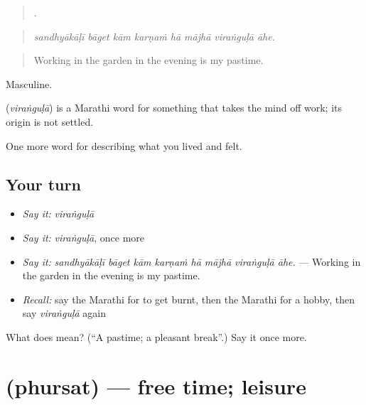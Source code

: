 \begin{quote}
       .
\end{quote}

\begin{quote}
\emph{sandhyākāḷī bāget kām karṇaṁ hā mājhā viraṅguḷā āhe.}
\end{quote}

\begin{quote}
Working in the garden in the evening is my pastime.
\end{quote}

Masculine.

\begin{cousinweb}
\textbf{} (\emph{viraṅguḷā}) is a Marathi word for something that takes the mind off work; its origin is not settled.
\end{cousinweb}

\begin{grammarlens}[title={What you've built}]
One more word for describing what you lived and felt.
\end{grammarlens}

\subsection*{Your turn}
\begin{itemize}
\raggedright
  \item \emph{Say it:} \emph{viraṅguḷā}
  \item \emph{Say it:} \emph{viraṅguḷā}, once more
  \item \emph{Say it:} \emph{sandhyākāḷī bāget kām karṇaṁ hā mājhā viraṅguḷā āhe.} — Working in the garden in the evening is my pastime.
  \item \emph{Recall:} say the Marathi for to get burnt, then the Marathi for a hobby, then say \emph{viraṅguḷā} again
\end{itemize}

\begin{tcolorbox}[breakable,colback=teal!4,colframe=teal!35!black,title={Before you move on}]
What does  mean? (\textquotedblleft{}A pastime; a pleasant break\textquotedblright{}.) Say it once more.
\end{tcolorbox}
\section[\texorpdfstring{\mr{फुरसत} (phursat)}{फुरसत (phursat)}]{ (phursat) — free time; leisure}

